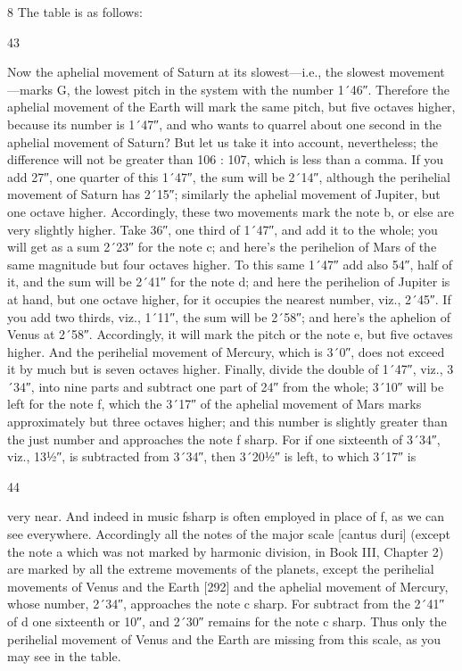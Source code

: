 \documentclass{article}
\begin{document}
8 The table is as follows:


43

Now the aphelial movement of Saturn at its slowest—i.e., the slowest
movement—marks G, the lowest pitch in the system with the number
1´46″. Therefore the aphelial movement of the Earth will mark the same
pitch, but five octaves higher, because its number is 1´47″, and who
wants to quarrel about one second in the aphelial movement of Saturn?
But let us take it into account, nevertheless; the difference will not be
greater than 106 : 107, which is less than a comma. If you add 27″, one
quarter of this 1´47″, the sum will be 2´14″, although the perihelial
movement of Saturn has 2´15″; similarly the aphelial movement of
Jupiter, but one octave higher. Accordingly, these two movements mark
the note b, or else are very slightly higher. Take 36″, one third of 1´47″,
and add it to the whole; you will get as a sum 2´23″ for the note c; and
here's the perihelion of Mars of the same magnitude but four octaves
higher. To this same 1´47″ add also 54″, half of it, and the sum will be
2´41″ for the note d; and here the perihelion of Jupiter is at hand, but
one octave higher, for it occupies the nearest number, viz., 2´45″. If you
add two thirds, viz., 1´11″, the sum will be 2´58″; and here's the aphelion
of Venus at 2´58″. Accordingly, it will mark the pitch or the note e, but
five octaves higher. And the perihelial movement of Mercury, which is
3´0″, does not exceed it by much but is seven octaves higher. Finally,
divide the double of 1´47″, viz., 3´34″, into nine parts and subtract one
part of 24″ from the whole; 3´10″ will be left for the note f, which the
3´17″ of the aphelial movement of Mars marks approximately but three
octaves higher; and this number is slightly greater than the just number
and approaches the note f sharp. For if one sixteenth of 3´34″, viz.,
13½″, is subtracted from 3´34″, then 3´20½″ is left, to which 3´17″ is


44

very near. And indeed in music fsharp is often employed in place of f, as
we can see everywhere.
Accordingly all the notes of the major scale [cantus duri] (except the
note a which was not marked by harmonic division, in Book III, Chapter
2) are marked by all the extreme movements of the planets, except the
perihelial movements of Venus and the Earth [292] and the aphelial
movement of Mercury, whose number, 2´34″, approaches the
note c sharp. For subtract from the 2´41″ of d one sixteenth or 10″, and
2´30″ remains for the note c sharp. Thus only the perihelial movement
of Venus and the Earth are missing from this scale, as you may see in the
table.
\end{document}
